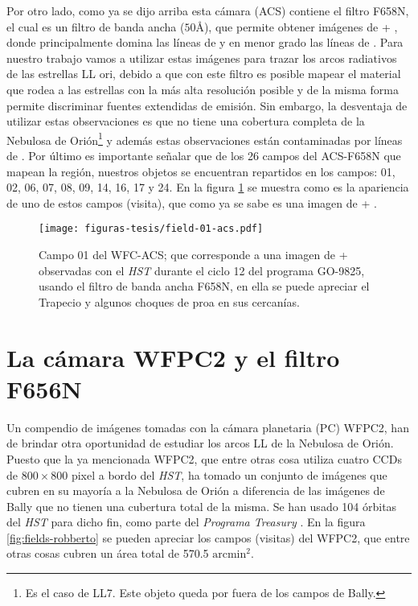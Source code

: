 Por otro lado, como ya se dijo arriba esta cámara (ACS) contiene el filtro F658N, el cual es un filtro de banda ancha (\(50 \text{Å}\)), que permite obtener imágenes de \ha{} + \nii{}, donde principalmente domina las líneas de \ha{} y en menor grado las líneas de \nii{}. Para nuestro trabajo vamos a utilizar estas imágenes para trazar los arcos radiativos de las estrellas LL ori, debido a que con este filtro es posible mapear el material que rodea a las estrellas con la más alta resolución posible y de la misma forma permite discriminar fuentes extendidas de emisión. Sin embargo, la desventaja de utilizar estas observaciones es que no tiene una cobertura completa de la Nebulosa de Orión\footnote{Es el caso de  LL7. Este objeto queda por fuera de los campos de Bally.} y además estas observaciones están contaminadas por líneas de \nii{}. Por último es importante señalar que de los 26 campos del ACS-F658N que mapean la región, nuestros objetos se encuentran repartidos en los campos: 01, 02, 06, 07, 08, 09, 14, 16, 17 y 24. En la figura \ref{fig:field-01} se muestra como es la apariencia de uno de estos campos (visita), que como ya se sabe es una imagen de \ha{} + \nii{}.\\

\begin{figure}
  \centering
  \texttt{[image: figuras-tesis/field-01-acs.pdf]}
  \caption{Campo 01 del WFC-ACS; que corresponde a una imagen de \ha{}+\nii{} observadas con el \textit{HST} durante el ciclo 12 del programa GO-9825, usando el filtro de banda ancha F658N, en ella se puede apreciar el Trapecio y algunos choques de proa en sus cercanías.}
  \label{fig:field-01}
\end{figure}

\section{La cámara WFPC2 y el filtro F656N}
\label{sec:wfpc2}

Un compendio de imágenes tomadas con la cámara planetaria (PC) WFPC2, han de brindar otra oportunidad de estudiar los arcos LL de la Nebulosa de Orión. Puesto que la ya mencionada WFPC2, que entre otras cosa utiliza cuatro CCDs de $800\times800$ pixel a bordo del \textit{HST}, ha tomado un conjunto de imágenes que cubren en su mayoría a la Nebulosa de Orión a diferencia de las imágenes de Bally que no tienen una cubertura total de la misma. Se han usado 104 órbitas del \textit{HST} para dicho fin, como parte del \textit{Programa Treasury} \citep{Robberto:2013a}. En la figura \ref{fig:fields-robberto} se pueden apreciar los campos (visitas) del WFPC2, que entre otras cosas cubren un área total de 570.5 \(\text{arcmin}^{2}\).\\


